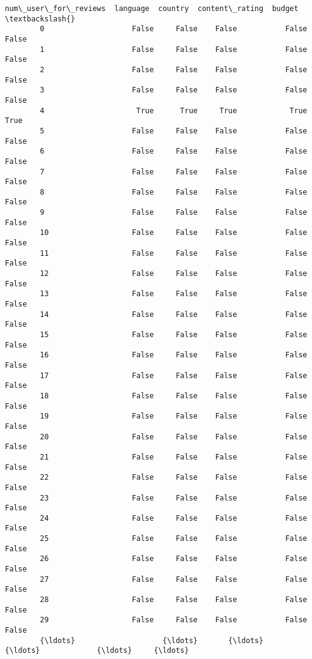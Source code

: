 \documentclass[11pt]{article}
\begin{document}
\begin{Verbatim}[commandchars=\\\{\}]
              num\_user\_for\_reviews  language  country  content\_rating  budget  \textbackslash{}
        0                    False     False    False           False   False   
        1                    False     False    False           False   False   
        2                    False     False    False           False   False   
        3                    False     False    False           False   False   
        4                     True      True     True            True    True   
        5                    False     False    False           False   False   
        6                    False     False    False           False   False   
        7                    False     False    False           False   False   
        8                    False     False    False           False   False   
        9                    False     False    False           False   False   
        10                   False     False    False           False   False   
        11                   False     False    False           False   False   
        12                   False     False    False           False   False   
        13                   False     False    False           False   False   
        14                   False     False    False           False   False   
        15                   False     False    False           False   False   
        16                   False     False    False           False   False   
        17                   False     False    False           False   False   
        18                   False     False    False           False   False   
        19                   False     False    False           False   False   
        20                   False     False    False           False   False   
        21                   False     False    False           False   False   
        22                   False     False    False           False   False   
        23                   False     False    False           False   False   
        24                   False     False    False           False   False   
        25                   False     False    False           False   False   
        26                   False     False    False           False   False   
        27                   False     False    False           False   False   
        28                   False     False    False           False   False   
        29                   False     False    False           False   False   
        {\ldots}                    {\ldots}       {\ldots}      {\ldots}             {\ldots}     {\ldots}   

\end{Verbatim}
\end{document}
